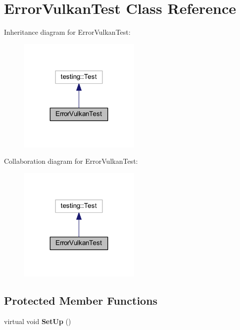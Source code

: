 \hypertarget{class_error_vulkan_test}{}\section{Error\+Vulkan\+Test Class Reference}
\label{class_error_vulkan_test}


Inheritance diagram for Error\+Vulkan\+Test\+:
\nopagebreak
\begin{figure}[H]
\begin{center}
\leavevmode
\includegraphics[width=167pt]{class_error_vulkan_test__inherit__graph}
\end{center}
\end{figure}


Collaboration diagram for Error\+Vulkan\+Test\+:
\nopagebreak
\begin{figure}[H]
\begin{center}
\leavevmode
\includegraphics[width=167pt]{class_error_vulkan_test__coll__graph}
\end{center}
\end{figure}
\subsection*{Protected Member Functions}
\begin{DoxyCompactItemize}
\item 
\hypertarget{class_error_vulkan_test_a5ae9d99b5e62289e47e4e7af7ab334ab}{}\label{class_error_vulkan_test_a5ae9d99b5e62289e47e4e7af7ab334ab} 
virtual void {\bfseries Set\+Up} ()
\end{DoxyCompactItemize}
